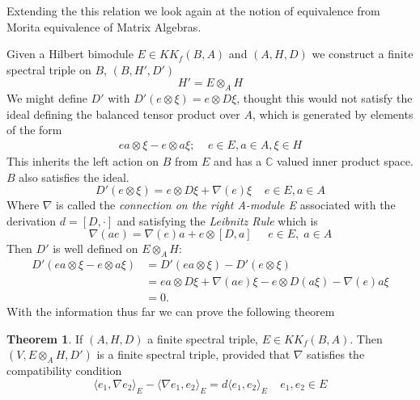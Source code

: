 \documentclass[a4paper]{article}
\theoremstyle{definition}
\theoremstyle{definition}
\theoremstyle{definition}
\theoremstyle{theorem}
\newtheorem{theorem}{Theorem}
\theoremstyle{theorem}
\begin{document}
Extending the this relation we look again at  the notion of equivalence from
Morita equivalence of Matrix Algebras.
\newline

Given a Hilbert bimodule $E \in KK_f(B, A)$ and $(A, H, D)$ we construct
a finite spectral triple on $B$, $(B, H', D')$
\begin{equation}
    H' = E \otimes _A H
\end{equation}
We might define $D'$ with $D'(e \otimes \xi) = e\otimes D\xi$, thought this
would not satisfy the ideal defining the balanced tensor product over $A$,
which is generated by elements of the form
\begin{align}
    e a \otimes \xi - e\otimes a \xi ;\;\;\;\; e\in E, a\in A, \xi \in H
\end{align}
This inherits the left action on $B$ from $E$ and has a $\mathbb{C}$
valued inner product space. $B$ also satisfies the ideal.
\begin{equation}
    D'(e\otimes \xi) = e \otimes D \xi + \nabla (e) \xi \;\;\;\; e\in
    E, a\in A
\end{equation}
Where $\nabla$ is called the \textit{connection on the right A-module E}
associated with the  derivation $d=[D, \cdot]$ and satisfying the
\textit{Leibnitz Rule} which is
\begin{equation}
    \nabla(ae) = \nabla(e)a + e \otimes [D, a] \;\;\;\;\;  e\in E,\; a\in A
\end{equation}
Then $D'$ is well defined on $E \otimes _A H$:
\begin{align*}
    D'(ea \otimes \xi - e \otimes a \xi) &=  D'(ea \otimes \xi) - D'(e
    \otimes \xi) \\
    &= ea\otimes D\xi + \nabla(ae) \xi - e \otimes D(a\xi ) - \nabla (e)a
    \xi \\
    &= 0.
\end{align*}
With the information thus far we can prove the following theorem
\begin{theorem}
    If $(A, H, D)$ a finite spectral triple, $E \in KK_f(B, A)$.
    Then $(V, E\otimes _A H, D')$ is a finite spectral triple, provided that
    $\nabla$ satisfies the compatibility condition
    \begin{equation}
        \langle e_1, \nabla e_2 \rangle _E - \langle \nabla e_1, e_2
        \rangle _E = d\langle e_1, e_2 \rangle _E \;\;\;\; e_1, e_2 \in E
    \end{equation}
\end{theorem}
\end{document}
